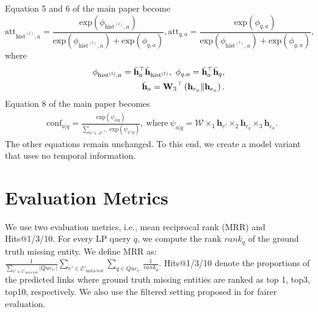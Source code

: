 \documentclass[runningheads]{llncs}
\begin{document}
Equation 5 and 6 of the main paper become
\begin{equation}
    \text{att}_{\text{hist}^{(l)},a} = \frac{\text{exp}(\phi_{\text{hist}^{(l)},a})} {\text{exp}(\phi_{\text{hist}^{(l)},a})+\text{exp}(\phi_{q,a})}, \text{att}_{q,a} = \frac{\text{exp}(\phi_{q,a})}{\text{exp}(\phi_{\text{hist}^{(l)},a})+\text{exp}(\phi_{q,a})},
\end{equation}
where
\begin{equation}
    \begin{aligned}
        \phi_{\text{hist}^{(l)},a} = {\Bar{\mathbf{h}}_a}^\top \Bar{\mathbf{h}}_{\text{hist}^{(l)}}, \ 
        \phi_{q,a} = {\Bar{\mathbf{h}}_a}^\top \Bar{\mathbf{h}}_{q},\\
        \Bar{\mathbf{h}}_a = {\mathbf{W}_3}^\top\left(\mathbf{h}_{r_a}\|\mathbf{h}_{e_a}\right).
    \end{aligned}
\end{equation}
Equation 8 of the main paper becomes
\begin{equation}
\label{eq: confidence static}
\begin{aligned}
        &\text{conf}_{a|q} = \frac{\text{exp}(\psi_{a|q})}{\sum_{a' \in \mathcal{A}^{(l)}} \text{exp}(\psi_{a'|q})}, \ \text{where}\ \psi_{a|q} = \mathcal{W} \times_1 \mathbf{h}_{e'} \times_2 \mathbf{h}_{r_q} \times_3 \mathbf{h}_{e_a}.
\end{aligned}
\end{equation}
The other equations remain unchanged. To this end, we create a model variant that uses no temporal information.

\section{Evaluation Metrics}
We use two evaluation metrics, i.e., mean reciprocal rank (MRR) and Hits@1/3/10. For every LP query $q$, we compute the rank $rank_q$ of the ground truth missing entity. We define MRR as: $\frac{1}{\sum_{e' \in \mathcal{E}'_{\text{meta-test}}} |Que_{e'}|}\sum_{e' \in \mathcal{E}'_{\text{meta-test}}} \sum_{q \in Que_{e'}} \frac{1}{rank_q}$. Hits@1/3/10 denote the proportions of the predicted links where ground truth missing entities are ranked as top 1, top3, top10, respectively. We also use the filtered setting proposed in \cite{DBLP:conf/nips/BordesUGWY13} for fairer evaluation.
\end{document}
